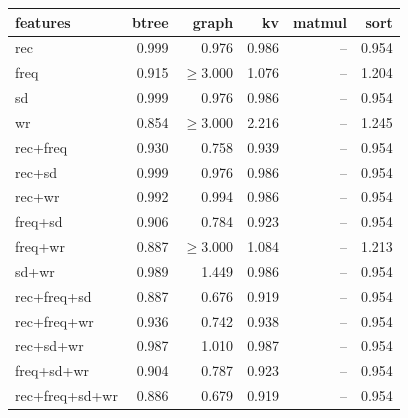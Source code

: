 \begin{tabular}{lrrrrr}
\toprule
features & btree & graph & kv & matmul & sort \\
\midrule
rec & 0.999 & 0.976 & 0.986 & -- & 0.954 \\
freq & 0.915 & $\geq$3.000 & 1.076 & -- & 1.204 \\
sd & 0.999 & 0.976 & 0.986 & -- & 0.954 \\
wr & 0.854 & $\geq$3.000 & 2.216 & -- & 1.245 \\
rec{+}freq & 0.930 & 0.758 & 0.939 & -- & 0.954 \\
rec{+}sd & 0.999 & 0.976 & 0.986 & -- & 0.954 \\
rec{+}wr & 0.992 & 0.994 & 0.986 & -- & 0.954 \\
freq{+}sd & 0.906 & 0.784 & 0.923 & -- & 0.954 \\
freq{+}wr & 0.887 & $\geq$3.000 & 1.084 & -- & 1.213 \\
sd{+}wr & 0.989 & 1.449 & 0.986 & -- & 0.954 \\
rec{+}freq{+}sd & 0.887 & 0.676 & 0.919 & -- & 0.954 \\
rec{+}freq{+}wr & 0.936 & 0.742 & 0.938 & -- & 0.954 \\
rec{+}sd{+}wr & 0.987 & 1.010 & 0.987 & -- & 0.954 \\
freq{+}sd{+}wr & 0.904 & 0.787 & 0.923 & -- & 0.954 \\
rec{+}freq{+}sd{+}wr & 0.886 & 0.679 & 0.919 & -- & 0.954 \\
\bottomrule
\end{tabular}
